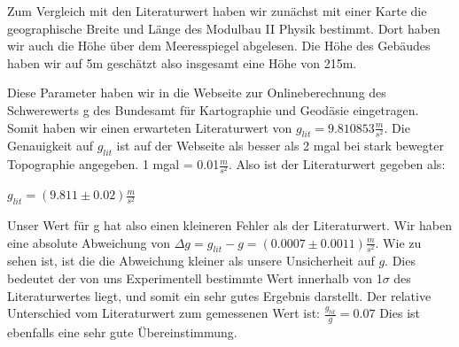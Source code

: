 \documentclass[twoside]{protokoll}
\begin{document}
Zum Vergleich mit den Literaturwert haben wir zunächst mit einer Karte die geographische Breite und Länge des Modulbau II Physik bestimmt.
Dort haben wir auch die Höhe über dem Meeresspiegel abgelesen. 
Die Höhe des Gebäudes haben wir auf 5m geschätzt also insgesamt eine Höhe von 215m.

Diese Parameter haben wir in die Webseite zur Onlineberechnung des Schwerewerts g des Bundesamt für Kartographie und Geodäsie eingetragen. 
Somit haben wir einen erwarteten Literaturwert von $g_{lit} = 9.810853 \frac{m}{s^2}$.
Die Genauigkeit auf $g_{lit}$ ist auf der Webseite als besser als 2 mgal bei stark bewegter Topographie angegeben.
1 mgal = 0.01$\frac{m}{s^2}$. Also ist der Literaturwert gegeben als:
\begin{center}
$g_{lit} = \left(9.811 \pm 0.02 \right)\frac{m}{s^2}$
\end{center}

Unser Wert für g hat also einen kleineren Fehler als der Literaturwert. 
Wir haben eine absolute Abweichung von $\Delta g = g_{lit} - g = (0.0007 \pm 0.0011) \frac{m}{s^2}$.
Wie zu sehen ist, ist die die Abweichung kleiner als unsere Unsicherheit auf $g$.
Dies bedeutet der von uns Experimentell bestimmte Wert innerhalb von 1$\sigma$ des Literaturwertes liegt, und somit ein sehr gutes Ergebnis darstellt.
Der relative Unterschied vom Literaturwert zum gemessenen Wert ist: $\frac{g_{lit}}{g} =  0.07$ \textperthousand
Dies ist ebenfalls eine sehr gute Übereinstimmung.
\end{document}

